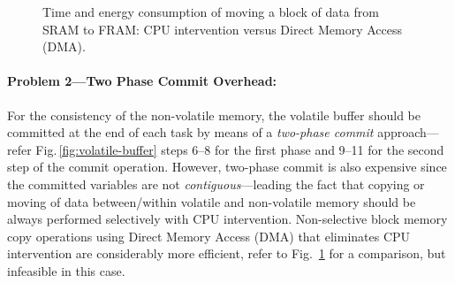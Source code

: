 \begin{figure}[t]
	\centering
	\caption{Time and energy consumption of moving a block of data from SRAM to FRAM: CPU intervention versus Direct Memory Access (DMA).}
	\label{fig:dmaTimeEnergy}
\end{figure}

\paragraph{Problem 2---Two Phase Commit Overhead:} For the consistency of the non-volatile memory, the volatile buffer should be committed at the end of each task by means of a \emph{two-phase commit} approach---refer Fig.\,\ref{fig:volatile-buffer} steps 6--8 for the first phase and 9--11 for the second step of the commit operation. However, two-phase commit is also expensive since the committed variables are not \emph{contiguous}---leading the fact that copying or moving of data between/within volatile and non-volatile memory should be always performed selectively with CPU intervention. Non-selective block memory copy operations using Direct Memory Access (DMA) that eliminates CPU intervention are considerably more efficient, refer to Fig.~\ref{fig:dmaTimeEnergy} for a comparison, but infeasible in this case.  


